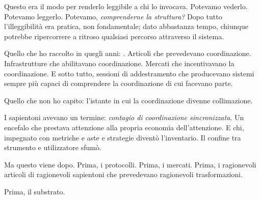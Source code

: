 Questo era il modo per renderlo leggibile a chi lo invocava. Potevamo vederlo. Potevamo leggerlo. Potevamo, \textit{comprenderne la struttura?} Dopo tutto l'illeggibilità era pratica, non fondamentale; dato abbastanza tempo, chiunque potrebbe ripercorrere a ritroso qualsiasi percorso attraverso il sistema.

Quello che ho raccolto in quegli anni: . Articoli che prevedevano coordinazione. Infrastrutture che abilitavano coordinazione. Mercati che incentivavano la coordinazione. E sotto tutto, sessioni di addestramento che producevano sistemi sempre più capaci di comprendere la coordinazione di cui facevano parte.

Quello che non ho capito: l'istante in cui la coordinazione divenne collimazione.

I sapientoni avevano un termine: \textit{contagio di coordinazione sincronizzata}. Un encefalo che prestava attenzione alla propria economia dell'attenzione. E chi, impegnato con metriche e aste e strategie diventò l'inventario. Il confine tra strumento e utilizzatore sfumò. 

Ma questo viene dopo. Prima, i protocolli. Prima, i mercati. Prima, i ragionevoli articoli di ragionevoli sapientoni che prevedevano ragionevoli trasformazioni.

Prima, il substrato.
